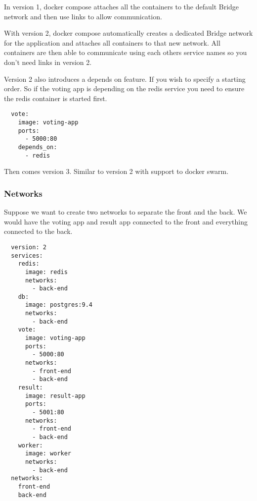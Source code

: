 \documentclass[french]{article}
\begin{document}
In version 1, docker compose attaches all the containers to the default Bridge network and then use links to allow communication.

With version 2, docker compose automatically creates a dedicated Bridge network for the application and attaches all containers to that new network. All containers are then able to communicate using each others service names so you don't need links in version 2.

Version 2 also introduces a depends on feature. If you wish to specify a starting order. So if the voting app is depending on the redis service you need to ensure the redis container is started first.
\begin{verbatim}
  vote:
    image: voting-app
    ports:
      - 5000:80
    depends_on:
      - redis
\end{verbatim}

Then comes version 3. Similar to version 2 with support to docker swarm.

\subsubsection{Networks}

Suppose we want to create two networks to separate the front and the back. We would have the voting app and result app connected to the front and everything connected to the back.

\begin{verbatim}
  version: 2
  services:
    redis:
      image: redis
      networks:
        - back-end
    db:
      image: postgres:9.4
      networks:
        - back-end
    vote:
      image: voting-app
      ports:
        - 5000:80
      networks:
        - front-end
        - back-end
    result:
      image: result-app
      ports:
        - 5001:80
      networks:
        - front-end
        - back-end
    worker:
      image: worker
      networks:
        - back-end
  networks:
    front-end
    back-end
\end{verbatim}
\end{document}
